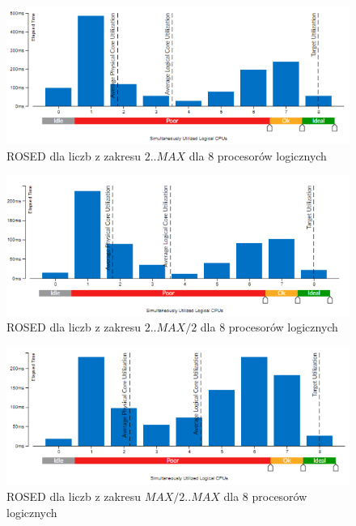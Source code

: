 \documentclass{article}
\begin{document}
                \begin{figure}[H]
                    \includegraphics[width=13cm]{rownolegly_domain_opt8_2_MAX}
                    \caption{\gls{ROSED} dla liczb z zakresu $2 .. MAX$ dla 8 procesorów logicznych}
                \end{figure}
                \begin{figure}[H]
                    \includegraphics[width=13cm]{rownolegly_domain_opt8_2_MAX2}
                    \caption{\gls{ROSED} dla liczb z zakresu $2 .. MAX / 2$ dla 8 procesorów logicznych}
                \end{figure}
                \begin{figure}[H]
                    \includegraphics[width=13cm]{rownolegly_domain_opt8_MAX2_MAX}
                    \caption{\gls{ROSED} dla liczb z zakresu $MAX / 2 .. MAX$ dla 8 procesorów logicznych}
                \end{figure}
                
\end{document}
